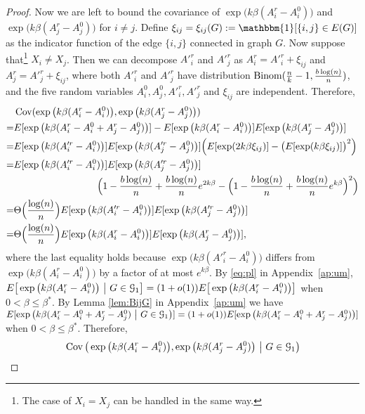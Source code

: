 \documentclass{article}
\begin{document}
\begin{proof}
Now we are left to bound the covariance of $\exp\big(k\beta (A^r_i-A^0_i) \big)$ and $\exp\big(k\beta (A^r_j-A^0_j) \big)$ for $i\neq j$.
Define $\xi_{ij}=\xi_{ij}(G):=\mathbbm{1}[\{i,j\}\in E(G)]$ as the indicator function of the edge $\{i,j\}$ connected in graph $G$.
Now suppose that\footnote{The case of $X_i=X_j$ can be handled in the same way.} $X_i\neq X_j$. Then we can decompose $A'^r_i$ and $A'^r_j$ as $A^r_i=A'^r_i+\xi_{ij}$ and $A^r_j=A'^r_j+\xi_{ij}$, where both $A'^r_i$ and $A'^r_j$ have distribution $\operatorname{Binom}(\frac{n}{k} - 1 , \frac{b\log(n)}{n})$,
and the five random variables $A^0_i, A^0_j, A'^r_i,A'^r_j$ and $\xi_{ij}$ are independent.
Therefore,
\begin{align*}
& \operatorname{Cov}(\exp\big(k\beta (A^r_i-A^0_i) \big), \exp\big(k\beta (A^r_j-A^0_j) \big) ) \\
= & E[\exp\big(k\beta (A^r_i-A^0_i+A^r_j-A^0_j) \big)] 
-E[\exp\big(k\beta (A^r_i-A^0_i) \big)] E[\exp\big(k\beta (A^r_j-A^0_j) \big)]   \\
= & E[\exp\big(k\beta (A'^r_i-A^0_i) \big)] E[\exp\big(k\beta (A'^r_j-A^0_j) \big)]  \Big( E[\exp(2k\beta \xi_{ij})] -
\big(E[\exp(k\beta \xi_{ij})]\big)^2 \Big) \\
= & E[\exp\big(k\beta (A'^r_i-A^0_i) \big)] E[\exp\big(k\beta (A'^r_j-A^0_j) \big)] \\
& \hspace*{1.2in}
\Big( 1-\frac{b\log(n)}{n} + \frac{b\log(n)}{n} e^{2k\beta} -
\Big(1-\frac{b\log(n)}{n} + \frac{b\log(n)}{n} e^{k\beta} \Big)^2 \Big) \\
= & \Theta\Big( \frac{\log(n)}{n} \Big) E[\exp\big(k\beta (A'^r_i-A^0_i) \big)] E[\exp\big(k\beta (A'^r_j-A^0_j) \big)] \\
= & \Theta\Big( \frac{\log(n)}{n} \Big) E[\exp\big(k\beta (A^r_i-A^0_i) \big)] E[\exp\big(k\beta (A^r_j-A^0_j) \big)]  ,
\end{align*} 
where the last equality holds because $\exp\big(k\beta (A'^r_i-A^0_i) \big)$ differs from $\exp\big(k\beta (A^r_i-A^0_i) \big)$  by a factor of at most $e^{k\beta}$. 
By \eqref{eq:pl} in Appendix~\ref{ap:um}, $E \big[  \exp\big(k\beta (A^r_i-A^0_i) \big) ~\big|~ G\in\mathcal{G}_1 \big] 
= (1+o(1)) E \big[  \exp\big(k\beta (A^r_i-A^0_i) \big) \big]$ when $0<\beta\le\beta^\ast$. By Lemma \ref{lem:BijG} in Appendix~\ref{ap:um} we have $E[\exp\big(k\beta (A^r_i-A^0_i+A^r_j-A^0_j) ~\big|~ G\in\mathcal{G}_1 \big)] = (1+o(1)) E[\exp\big(k\beta (A^r_i-A^0_i+A^r_j-A^0_j) \big)]$ when $0<\beta\le\beta^\ast$.
Therefore,
\begin{align*}
& \Cov \big(\exp\big(k\beta (A^r_i-A^0_i) \big), \exp\big(k\beta (A^r_j-A^0_j)  \big) ~\big|~ G\in\cG_1 \big) \\

\end{align*}
\end{proof}
\end{document}
